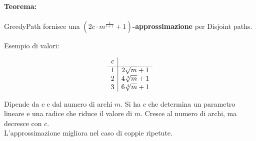 \paragraph{Teorema:} GreedyPath fornisce una \textbf{$\left(2c \cdot m^{\frac{1}{c+1}} + 1\right)$-approssimazione} per Disjoint paths.

\vfill

Esempio di valori:
\begin{center}
	$$
	\begin{array}{c | c}
		c & \\
		\hline
		1 & 2 \sqrt{m} + 1 \\
		2 & 4 \sqrt[3]{m} + 1 \\
		3 & 6 \sqrt[4]{m} + 1 \\
	\end{array}
	$$
\end{center}

Dipende da $c$ e dal numero di archi $m$. Si ha $c$ che determina un parametro lineare e una radice che riduce il valore di $m$. Cresce al numero di archi, ma decresce con $c$.\\


L'approssimazione migliora nel caso di coppie ripetute.\\

\newpage